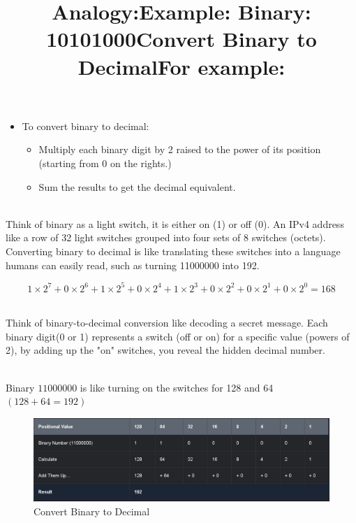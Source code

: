 \documentclass[a4paper,11pt]{article}
\begin{document}
\begin{enumerate}
    \begin{itemize}
        \item To convert binary to decimal:\\
        \begin{itemize}
            \item Multiply each binary digit by 2 raised to the power of its position (starting from 0 on the rights.)\\
            \item Sum the results to get the decimal equivalent.\\
        \end{itemize}
    \end{itemize}
\end{enumerate}

\title{Analogy:}\\
Think of binary as a light switch, it is either on (1) or off (0). An IPv4 address like a row of 32 light switches grouped into four sets of 8 switches (octets). Converting binary to decimal is like translating these switches into a language humans can easily read, such as turning 11000000 into 192.\\

\title{Example: Binary: 10101000}

\begin{equation}
1 \times 2^{7} + 0 \times 2^{6} + 1 \times 2^{5} + 0 \times 2^{4} + 1 \times 2^{3} + 0 \times 2^{2} + 0 \times 2^{1} + 0 \times 2^{0} = 168
\end{equation}

\title{Convert Binary to Decimal}\\
Think of binary-to-decimal conversion like decoding a secret message. Each binary digit(0 or 1) represents a switch (off or on) for a specific value (powers of 2), by adding up the "on" switches, you reveal the hidden decimal number.\\

\title{For example:}\\
Binary $11000000$ is like turning on the switches for 128 and 64 $(128 + 64 = 192)$

\begin{figure}[h!]
    \centering
    \includegraphics[width=\textwidth]{13.png}
    \caption{Convert Binary to Decimal}
    \label{fig:cap1}
\end{figure}
\end{document}
